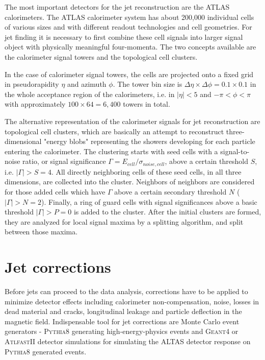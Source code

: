 The most important detectors for the jet reconstruction are the ATLAS calorimeters.
The ATLAS calorimeter system has about 200,000 individual cells of various sizes
and with different readout technologies and cell geometries. For jet finding it
is necessary to first combine these cell signals into larger signal object with
physically meaningful four-momenta. The two concepts available are the calorimeter
signal towers and the topological cell clusters.

In the case of calorimeter signal towers, the cells are projected onto a fixed
grid in pseudorapidity $\eta$ and azimuth $\phi$. The tower bin size is $\Delta
\eta \times \Delta \phi = 0.1 \times 0.1$ in the whole acceptance region of the
calorimeters, i.e. in $|\eta| < 5$ and $- \pi < \phi < \pi$ with approximately 
$100 \times 64 = 6,400$ towers in total.

The alternative representation of the calorimeter signals for jet
reconstruction are topological cell clusters, which are basically an attempt to
reconstruct three-dimensional "energy blobs" representing the showers developing
for each particle entering the calorimeter. The clustering starts with seed
cells with a signal-to-noise ratio, or signal significance $\Gamma = E_{cell} /
\sigma_{noise,cell}$, above a certain threshold $S$, i.e. $|\Gamma| > S = 4$.
All directly neighboring cells of these seed cells, in all three dimensions,
are collected into the cluster. Neighbors of neighbors are considered for
those added cells which have $\Gamma$ above a certain secondary threshold $N$
($|\Gamma| > N = 2$). Finally, a ring of guard cells with signal significances
above a basic threshold $|\Gamma| > P = 0$ is added to the cluster. After the
initial clusters are formed, they are analyzed for local signal maxima by a
splitting algorithm, and split between those maxima.

\section{Jet corrections}

Before jets can proceed to the data analysis, corrections have to be applied to
minimize detector effects including calorimeter non-compensation, noise, losses
in dead material and cracks, longitudinal leakage and particle deflection in the
magnetic field. Indispensable tool for jet corrections are Monte Carlo event
generators - \textsc{Pythia8} \cite{Pythia8} generating high-energy-physics
events and \textsc{Geant4} \cite{Geant4} or \textsc{AtlfastII} \cite{AtlfastII}
detector simulations for simulating the ALTAS detector response on
\textsc{Pythia8} generated events.

